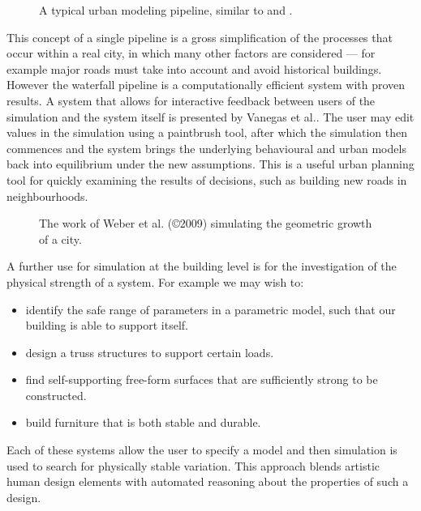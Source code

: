 \begin{figure}
\centering
\def\svgwidth{1.0\columnwidth}

\caption[An urban modeling pipeline]{\label{fig:umPipeline}A typical urban modeling pipeline, similar to \cite{Weber09} and \cite{Vanegas10:MAB}.}
\end{figure}

This concept of a single pipeline is a gross simplification of the processes that occur within a real city, in which many other factors are considered --- for example major roads must take into account and avoid historical buildings. However the waterfall pipeline is a computationally efficient system with proven results.  A system that allows for interactive feedback between users of the simulation and the system itself is presented by Vanegas et al.\cite{Vanegas09:IDU}. The user may edit values in the simulation using a paintbrush tool, after which the simulation then commences and the system brings the underlying behavioural and urban models back into equilibrium under the new assumptions. This is a useful urban planning tool for quickly examining the results of decisions, such as building new roads in neighbourhoods.

\begin{figure}
\centering
\def\svgwidth{1.\columnwidth}

\caption[Simulating the growth of a city]{\label{fig:weber4d}The work of Weber et al. (\copyright 2009) simulating the geometric growth of a city\cite{Weber09}.}
\end{figure}

A further use for simulation at the building level is for the investigation of the physical strength of a system. For example we may wish to:
\begin{itemize}
\item identify the safe range of parameters in a parametric model, such that our building is able to support itself\cite{Whiting09}.
\item design a truss structures to support certain loads\cite{Smith02}.
\item find self-supporting free-form surfaces\cite{Vouga12} that are sufficiently strong to be constructed.
\item build furniture that is both stable and durable\cite{Umetani12}.
\end{itemize}

Each of these systems allow the user to specify a model and then simulation is used to search for physically stable variation. This approach blends artistic human design elements with automated reasoning about the properties of such a design.

